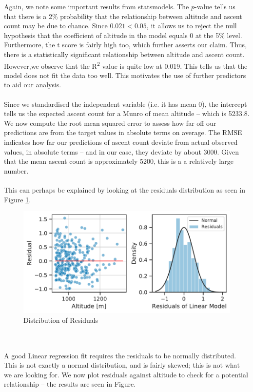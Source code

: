 \documentclass[11pt,a4paper]{article}
\begin{document}
Again, we note some important results from statsmodels. The $p$-value tells us that there is a 2\% probability that the relationship between altitude and ascent count may be due to chance. Since $0.021 < 0.05$, it allows us to reject the null hypothesis that the coefficient of altitude in the model equals 0 at the 5\% level. Furthermore, the t score is fairly high too, which further asserts our claim. Thus, there is a statistically significant relationship between altitude and ascent count. However,we observe that the R\textsuperscript{2} value is quite low at 0.019. This tells us that the model does not fit the data too well. This motivates the use of further predictors to aid our analysis. \\ \\
Since we standardised the independent variable (i.e. it has mean 0), the intercept tells us the expected ascent count for a Munro of mean altitude – which is 5233.8. We now compute the root mean squared error to assess how far off our predictions are from the target values in absolute terms on average. The RMSE indicates how far our predictions of ascent count deviate from actual observed values, in absolute terms – and in our case, they deviate by about 3000. Given that the mean ascent count is approximately 5200, this is a a relatively large number. \\ \\
This can perhaps be explained by looking at the residuals distribution as seen in Figure \ref{fds-project-template:fig:uni_residuals}.
\begin{figure} [h!]
  \centering
  \includegraphics{report/uni_residuals.pdf}
  \caption{Distribution of Residuals}
  \label{fds-project-template:fig:uni_residuals}
\end{figure} \\ \\ 
A good Linear regression fit requires the residuals to be normally distributed. This is not exactly a normal distribution, and is fairly skewed; this is not what we are looking for. We now plot residuals against altitude to check for a potential relationship – the results are seen in Figure. \\ \\
\end{document}
